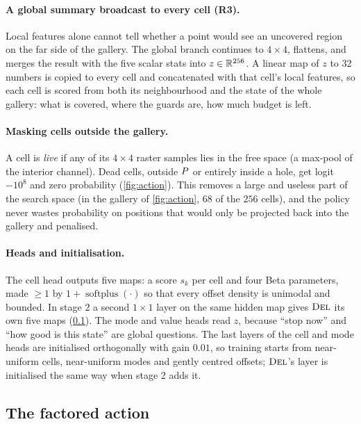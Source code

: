 \documentclass[11pt,a4paper]{article}
\begin{document}
\paragraph{A global summary broadcast to every cell (R3).}
Local features alone cannot tell whether a point would see an uncovered region on the far
side of the gallery. The global branch continues to $4\times4$, flattens, and merges the
result with the five scalar stats into $z\in\mathbb{R}^{256}$. A linear map of $z$ to $32$
numbers is copied to every cell and concatenated with that cell's local features, so each
cell is scored from both its neighbourhood and the state of the whole gallery: what is
covered, where the guards are, how much budget is left.

\paragraph{Masking cells outside the gallery.}
A cell is \emph{live} if any of its $4\times4$ raster samples lies in the free space (a max-pool
of the interior channel). Dead cells, outside $P$ or entirely inside a hole, get logit
$-10^{8}$ and zero probability (\cref{fig:action}). This removes a large and useless part of
the search space (in the gallery of \cref{fig:action}, $68$ of the $256$ cells), and the
policy never wastes probability on positions that would only be projected back into the
gallery and penalised.

\paragraph{Heads and initialisation.}
The cell head outputs five maps: a score $s_k$ per cell and four Beta parameters, made
$\ge 1$ by $1+\operatorname{softplus}(\cdot)$ so that every offset density is unimodal and
bounded. In stage 2 a second $1{\times}1$ layer on the same hidden map gives $\textsc{Del}$ its own
five maps (\cref{sec:action}). The mode and value heads read $z$, because ``stop now'' and ``how good is this
state'' are global questions. The last layers of the cell and mode heads are initialised
orthogonally with gain $0.01$, so training starts from near-uniform cells, near-uniform modes
and gently centred offsets; $\textsc{Del}$'s layer is initialised the same way when stage 2 adds it.

\subsection{The factored action}\label{sec:action}
\end{document}
